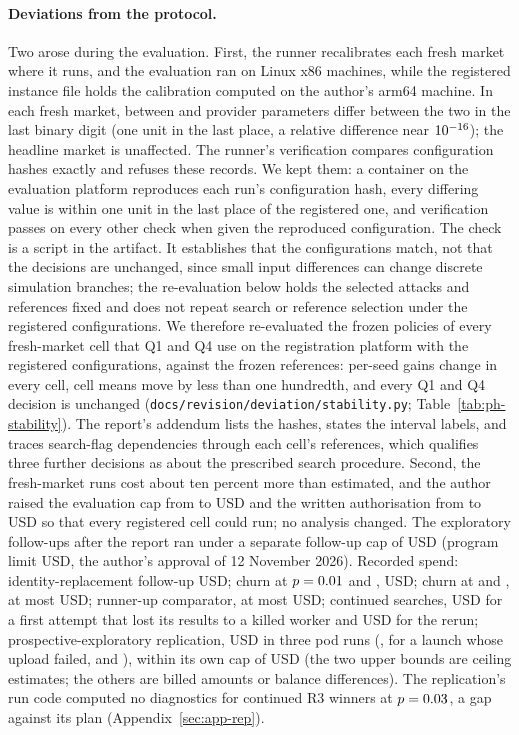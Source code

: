 \documentclass[11pt]{article}
\begin{document}
\paragraph{Deviations from the protocol.} Two arose during the evaluation. First, the runner recalibrates each fresh market where it runs, and the evaluation ran on Linux x86 machines, while the registered instance file holds the calibration computed on the author's arm64 machine. In each fresh market, between  and  provider parameters differ between the two in the last binary digit (one unit in the last place, a relative difference near $10^{-16}$); the headline market is unaffected. The runner's verification compares configuration hashes exactly and refuses these records. We kept them: a container on the evaluation platform reproduces each run's configuration hash, every differing value is within one unit in the last place of the registered one, and verification passes on every other check when given the reproduced configuration. The check is a script in the artifact. It establishes that the configurations match, not that the decisions are unchanged, since small input differences can change discrete simulation branches; the re-evaluation below holds the selected attacks and references fixed and does not repeat search or reference selection under the registered configurations. We therefore re-evaluated the frozen policies of every fresh-market cell that Q1 and Q4 use on the registration platform with the registered configurations, against the frozen references: per-seed gains change in every cell, cell means move by less than one hundredth, and every Q1 and Q4 decision is unchanged (\texttt{docs/revision/deviation/stability.py}; Table~\ref{tab:ph-stability}). The report's addendum lists the hashes, states the interval labels, and traces search-flag dependencies through each cell's references, which qualifies three further decisions as about the prescribed search procedure. Second, the fresh-market runs cost about ten percent more than estimated, and the author raised the evaluation cap from  to  USD and the written authorisation from  to  USD so that every registered cell could run; no analysis changed. The exploratory follow-ups after the report ran under a separate follow-up cap of  USD (program limit  USD, the author's approval of 12 November 2026). Recorded spend: identity-replacement follow-up  USD; churn at $p = 0.01$ and ,  USD; churn at  and , at most  USD; runner-up comparator, at most  USD; continued searches,  USD for a first attempt that lost its results to a killed worker and  USD for the rerun; prospective-exploratory replication,  USD in three pod runs (,  for a launch whose upload failed, and ), within its own cap of  USD (the two upper bounds are ceiling estimates; the others are billed amounts or balance differences). The replication's run code computed no diagnostics for continued R3 winners at $p = 0.03$, a gap against its plan (Appendix~\ref{sec:app-rep}).
\end{document}
